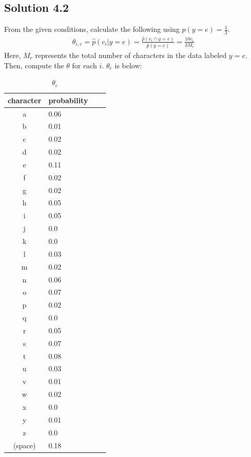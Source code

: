 \documentclass[a4paper]{article}
\theoremstyle{definition}
\newenvironment{soln}{
	\leavevmode\color{blue}\ignorespaces
}{}
\begin{document}
	\subsection*{Solution 4.2}		
	\begin{soln}
	From the given conditions, calculate the following using $p(y = e) = \frac{1}{3}$.
		\begin{equation*}\label{xx}
			\begin{split}
				\theta_{i,e} = \hat{p}(c_i | y = e) = \frac{\hat{p}(c_i \cap y=e )}{\hat{p}(y=e)} = \frac{10 c_i}{3 M_e} 
			\end{split}
		\end{equation*}		
	Here, $M_e$ represents the total number of characters in the data labeled $y = e$. Then, compute the $\theta$ for each $i$. $\theta_e$ is below:
\begin{table}[ht]
 \caption{$\theta_e$}
 \centering
  \begin{tabular}{clll}
   \hline
   character & probability \\
   \hline \hline
a & 0.06 \\
b & 0.01 \\
c & 0.02 \\
d & 0.02 \\
e & 0.11 \\
f & 0.02 \\
g & 0.02 \\
h & 0.05 \\
i & 0.05 \\
j & 0.0 \\
k & 0.0 \\
l & 0.03 \\
m & 0.02 \\
n & 0.06 \\
o & 0.07 \\
p & 0.02 \\
q & 0.0 \\
r & 0.05 \\
s & 0.07 \\
t & 0.08 \\
u & 0.03 \\
v & 0.01 \\
w & 0.02 \\
x & 0.0 \\
y & 0.01 \\
z & 0.0 \\
(space)  & 0.18 \\
   \hline
  \end{tabular}
\end{table}
	\end{soln}	
\end{document}
